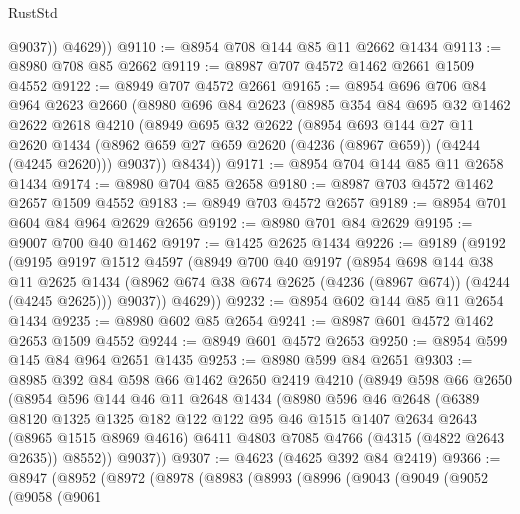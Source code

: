 \begin{lexlean}{RustStd}
\begin{coremodule}
            @9037))
        @4629))
@9110 := @8954 @708 @144 @85 @11 @2662 @1434
@9113 := @8980 @708 @85 @2662
@9119 := @8987 @707 @4572 @1462 @2661 @1509 @4552
@9122 := @8949 @707 @4572 @2661
@9165 := @8954
    @696
    @706
    @84
    @964
    @2623
    @2660
    (@8980
      @696
      @84
      @2623
      (@8985
        @354
        @84
        @695
        @32
        @1462
        @2622
        @2618
        @4210
        (@8949
          @695
          @32
          @2622
          (@8954
            @693
            @144
            @27
            @11
            @2620
            @1434
            (@8962 @659 @27 @659 @2620 (@4236 (@8967 @659)) (@4244 (@4245 @2620)))
            @9037))
        @8434))
@9171 := @8954 @704 @144 @85 @11 @2658 @1434
@9174 := @8980 @704 @85 @2658
@9180 := @8987 @703 @4572 @1462 @2657 @1509 @4552
@9183 := @8949 @703 @4572 @2657
@9189 := @8954 @701 @604 @84 @964 @2629 @2656
@9192 := @8980 @701 @84 @2629
@9195 := @9007 @700 @40 @1462
@9197 := @1425 @2625 @1434
@9226 := @9189
    (@9192
      (@9195
        @9197
        @1512
        @4597
        (@8949
          @700
          @40
          @9197
          (@8954
            @698
            @144
            @38
            @11
            @2625
            @1434
            (@8962 @674 @38 @674 @2625 (@4236 (@8967 @674)) (@4244 (@4245 @2625)))
            @9037))
        @4629))
@9232 := @8954 @602 @144 @85 @11 @2654 @1434
@9235 := @8980 @602 @85 @2654
@9241 := @8987 @601 @4572 @1462 @2653 @1509 @4552
@9244 := @8949 @601 @4572 @2653
@9250 := @8954 @599 @145 @84 @964 @2651 @1435
@9253 := @8980 @599 @84 @2651
@9303 := @8985
    @392
    @84
    @598
    @66
    @1462
    @2650
    @2419
    @4210
    (@8949
      @598
      @66
      @2650
      (@8954
        @596
        @144
        @46
        @11
        @2648
        @1434
        (@8980
          @596
          @46
          @2648
          (@6389
            @8120
            @1325
            @1325
            @182
            @122
            @122
            @95
            @46
            @1515
            @1407
            @2634
            @2643
            (@8965 @1515 @8969 @4616)
            @6411
            @4803
            @7085
            @4766
            (@4315 (@4822 @2643 @2635))
            @8552))
        @9037))
@9307 := @4623 (@4625 @392 @84 @2419)
@9366 := @8947
    (@8952
      (@8972
        (@8978
          (@8983
            (@8993
              (@8996
                (@9043
                  (@9049
                    (@9052
                      (@9058
                        (@9061

\end{coremodule}
\end{lexlean}
